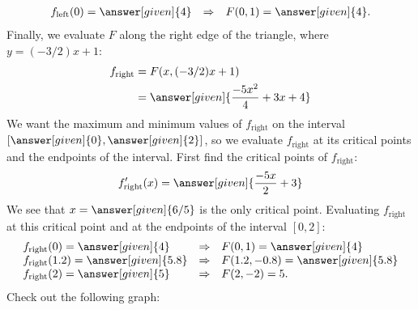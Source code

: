 \documentclass{ximera}
\begin{document}
\begin{example}
\begin{explanation}
\[\begin{array}{lcl}
      f_{\mathrm{left}}(0) = \answer[given]{4} &\Rightarrow & F(0,1) = \answer[given]{4}.
    \end{array}
    \]
    Finally, we evaluate $F$ along the right edge of the triangle,
    where $y = (-3/2)x+1$:
    \begin{align*}
      f_{\mathrm{right}} &= F(x,(-3/2)x+1)\\
      &= \answer[given]{\frac{-5x^2}{4}+3x+4}
    \end{align*}
    We want the maximum and minimum values of $f_{\mathrm{right}}$ on
    the interval $\left[\answer[given]{0},\answer[given]{2}\right]$, so we
    evaluate $f_{\mathrm{right}}$ at its critical points and the
    endpoints of the interval. First find the critical points of
    $f_{\mathrm{right}}$:
    \[
    f'_{\mathrm{right}}(x) = \answer[given]{\frac{-5x}{2}+3}
    \]
    We see that $x = \answer[given]{6/5}$ is the only critical point.
    Evaluating $f_{\mathrm{right}}$ at this critical point and at the
    endpoints of the interval $[0,2]$:
    \[
    \begin{array}{lcl}
      f_{\mathrm{right}}(0) = \answer[given]{4} &\Rightarrow & F(0,1) = \answer[given]{4}\\
      f_{\mathrm{right}}(1.2) = \answer[given]{5.8} &\Rightarrow &  F(1.2,-0.8) = \answer[given]{5.8}\\
      f_{\mathrm{right}}(2) = \answer[given]{5} &\Rightarrow&  F(2,-2) = 5.
    \end{array}
    \]
    Check out the following graph:
    \begin{image}
\end{image}
\end{explanation}
\end{example}
\end{document}
